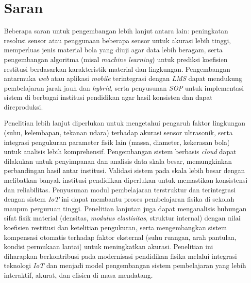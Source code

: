 \section{Saran}

Beberapa saran untuk pengembangan lebih lanjut antara lain: peningkatan resolusi sensor atau penggunaan beberapa sensor untuk akurasi lebih tinggi, memperluas jenis material bola yang diuji agar data lebih beragam, serta pengembangan algoritma (misal \textit{machine learning}) untuk prediksi koefisien restitusi berdasarkan karakteristik material dan lingkungan. Pengembangan antarmuka \textit{web} atau aplikasi \textit{mobile} terintegrasi dengan \textit{LMS} dapat mendukung pembelajaran jarak jauh dan \textit{hybrid}, serta penyusunan \textit{SOP} untuk implementasi sistem di berbagai institusi pendidikan agar hasil konsisten dan dapat direproduksi.

Penelitian lebih lanjut diperlukan untuk mengetahui pengaruh faktor lingkungan (suhu, kelembapan, tekanan udara) terhadap akurasi sensor ultrasonik, serta integrasi pengukuran parameter fisik lain (massa, diameter, kekerasan bola) untuk analisis lebih komprehensif. Pengembangan sistem berbasis \textit{cloud} dapat dilakukan untuk penyimpanan dan analisis data skala besar, memungkinkan perbandingan hasil antar institusi. Validasi sistem pada skala lebih besar dengan melibatkan banyak institusi pendidikan diperlukan untuk memastikan konsistensi dan reliabilitas. Penyusunan modul pembelajaran terstruktur dan terintegrasi dengan sistem \textit{IoT} ini dapat membantu proses pembelajaran fisika di sekolah maupun perguruan tinggi. Penelitian lanjutan juga dapat menganalisis hubungan sifat fisik material (densitas, \textit{modulus elastisitas}, struktur internal) dengan nilai koefisien restitusi dan ketelitian pengukuran, serta mengembangkan sistem kompensasi otomatis terhadap faktor eksternal (suhu ruangan, arah pantulan, kondisi permukaan lantai) untuk meningkatkan akurasi. Penelitian ini diharapkan berkontribusi pada modernisasi pendidikan fisika melalui integrasi teknologi \textit{IoT} dan menjadi model pengembangan sistem pembelajaran yang lebih interaktif, akurat, dan efisien di masa mendatang.
